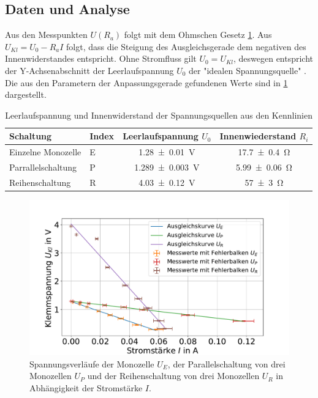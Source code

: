 \subsection{Daten und Analyse}


Aus den Messpunkten $U(R_a)$ folgt mit dem Ohmschen Gesetz \cref{fig:batt-ges-u}. Aus $U_{Kl}=U_0-R_a I$ folgt, dass die Steigung des Ausgleichsgerade dem negativen des Innenwiderstandes entspricht. Ohne Stromfluss gilt $U_0=U_{Kl}$, deswegen entspricht der Y-Achsenabschnitt der Leerlaufspannung $U_0$ der "idealen Spannungsquelle" \cite{lw}. Die aus den Parametern der Anpassungsgerade gefundenen Werte sind in \cref{tab:batt-U-R} dargestellt.





\begin{table}
	\caption{Leerlaufspannung und Innenwiderstand der Spannungsquellen aus den Kennlinien}
	\centering
	\begin{tabular}{|l l||c|c|}
		\hline 
		Schaltung & Index	& Leerlaufspannung $U_0$ & Innenwiederstand $R_i$ \\ 
		\hline \hline
		Einzelne Monozelle	&E& \SI{1.28+-0.01}{V}  & \SI{17.7+-0.4}{\ohm } \\ 
		\hline  
		Parrallelschaltung	&P& \SI{1.289+-0.003}{V } &\SI{5.99+-0.06}{\ohm }  \\ 
		\hline   
		Reihenschaltung	&R& \SI{4.03+-0.12}{V } &\SI{57+-3}{\ohm }  \\ 
		\hline 
	\end{tabular} 
	
	\label{tab:batt-U-R}
	
\end{table}


 


\begin{figure}[h]
	\centering
	\includegraphics[width=0.9\linewidth]{"auswertung/Auswertung Innenwiderstand/Batterie Gesamt U"}
	\caption{Spannungsverläufe der Monozelle $U_E$, der Parallelschaltung von drei Monozellen $U_P$ und der Reihenschaltung von drei Monozellen $U_R$ in Abhängigkeit der Stromstärke $I$.}
	\label{fig:batt-ges-u}
\end{figure}










